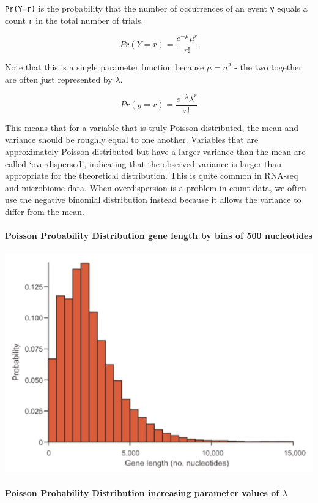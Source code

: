 \documentclass[
]{book}
\begin{document}
\texttt{Pr(Y=r)} is the probability that the number of occurrences of an event \texttt{y} equals a count \texttt{r} in the total number of trials.

\[Pr(Y=r) = \frac{e^{-\mu}\mu^r}{r!}\]

Note that this is a single parameter function because \(\mu = \sigma^2\) - the two together are often just represented by \(\lambda\).

\[Pr(y=r) = \frac{e^{-\lambda}\lambda^r}{r!}\]

This means that for a variable that is truly Poisson distributed, the mean and variance should be roughly equal to one another. Variables that are approximately Poisson distributed but have a larger variance than the mean are called `overdispersed', indicating that the observed variance is larger than appropriate for the theoretical distribution. This is quite common in RNA-seq and microbiome data. When overdispersion is a problem in count data, we often use the negative binomial distribution instead because it allows the variance to differ from the mean.

\hypertarget{poisson-probability-distribution-gene-length-by-bins-of-500-nucleotides}{%
\paragraph{Poisson Probability Distribution \textbar{} gene length by bins of 500 nucleotides}\label{poisson-probability-distribution-gene-length-by-bins-of-500-nucleotides}}

\begin{center}\includegraphics[width=0.8\linewidth]{images/week_2.004} \end{center}

\hypertarget{poisson-probability-distribution-increasing-parameter-values-of-lambda}{%
\paragraph{\texorpdfstring{Poisson Probability Distribution \textbar{} increasing parameter values of \(\lambda\)}{Poisson Probability Distribution \textbar{} increasing parameter values of \textbackslash lambda}}\label{poisson-probability-distribution-increasing-parameter-values-of-lambda}}
\end{document}
